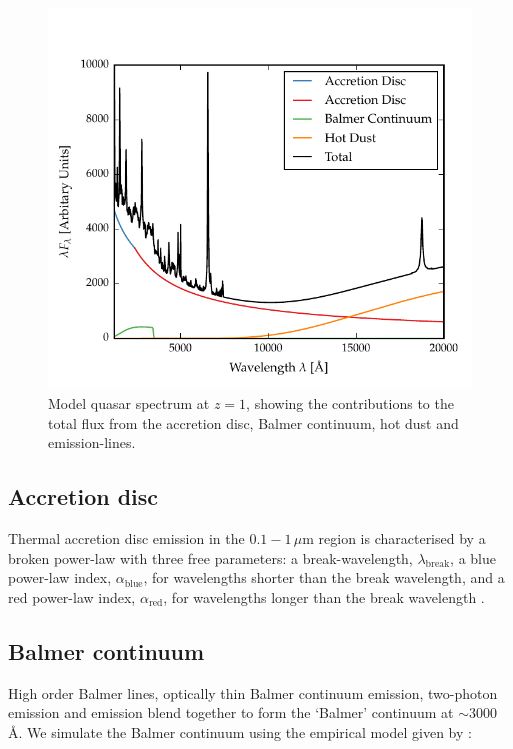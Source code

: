 \begin{figure}[h!]
  \centering
  \includegraphics[width=\textwidth]{figures/chapter05/sed_model.pdf}
  \caption[{Model quasar spectrum at $z=1$.}]{Model quasar spectrum at $z=1$, showing the contributions to the total flux from the accretion disc, Balmer continuum, hot dust and emission-lines. }
  \label{fig:modelsed}
\end{figure}

\subsection{Accretion disc}

Thermal accretion disc emission in the $0.1 - 1$\,$\mu$m region is characterised by a broken power-law with three free parameters: a break-wavelength, $\lambda_{\text{break}}$, a blue power-law index, $\alpha_{\text{blue}}$, for wavelengths shorter than the break wavelength, and a red power-law index, $\alpha_{\text{red}}$, for wavelengths longer than the break wavelength \citep[e.g.][]{stevans14}.

\subsection{Balmer continuum}

High order Balmer lines, optically thin Balmer continuum emission, two-photon emission and  emission blend together to form the `Balmer' continuum at $\sim3000$\,\AA.
We simulate the Balmer continuum using the empirical model given by \citet{grandi82}:

